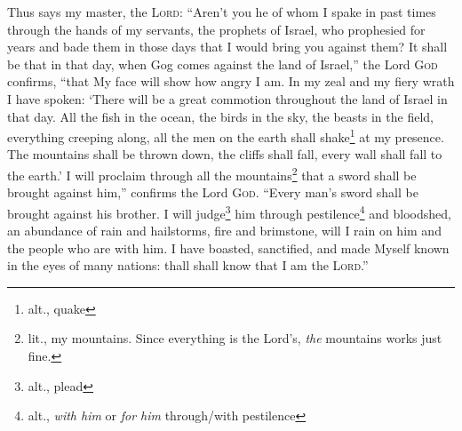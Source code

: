 
\begin{inparaenum}
     Thus says my master, the \textsc{Lord}: ``Aren't you he of whom I spake in past times through the hands of my servants, the prophets of Israel, who prophesied for years and bade them in those days that I would bring you against them?%
     It shall be that in that day, when Gog comes against the land of Israel,'' the Lord \textsc{God} confirms, ``that My face will show how angry I am.%
     In my zeal and my fiery wrath I have spoken: `There will be a great commotion throughout the land of Israel in that day.%
     All the fish in the ocean, the birds in the sky, the beasts in the field, everything creeping along, all the men on the earth shall shake\footnote{alt., quake} at my presence. The mountains shall be thrown down, the cliffs shall fall, every wall shall fall to the earth.'%
     I will proclaim through all the mountains\footnote{lit., my mountains. Since everything is the Lord's, \textit{the} mountains works just fine.} that a sword shall be brought against him,'' confirms the Lord \textsc{God}. ``Every man's sword shall be brought against his brother.%
     I will judge\footnote{alt., plead} him through pestilence\footnote{alt., \textit{with him} or \textit{for him} through/with pestilence} and bloodshed, an abundance of rain and hailstorms, fire and brimstone, will I rain on him and the people who are with him.%
     I have boasted, sanctified, and made Myself known in the eyes of many nations: thall shall know that I am the \textsc{Lord}.''%
\end{inparaenum}
